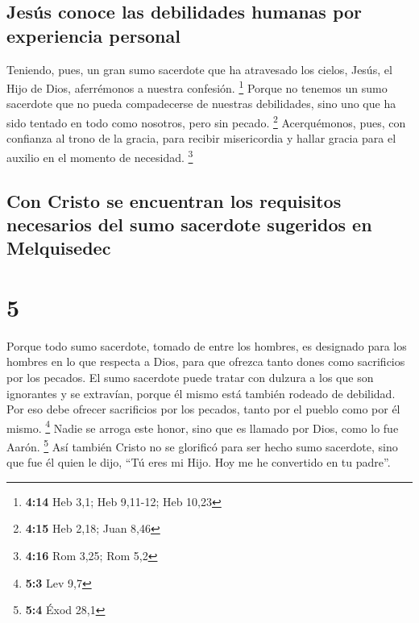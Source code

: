 \hypertarget{jesuxfas-conoce-las-debilidades-humanas-por-experiencia-personal}{%
\subsection{Jesús conoce las debilidades humanas por experiencia
personal}\label{jesuxfas-conoce-las-debilidades-humanas-por-experiencia-personal}}

 Teniendo, pues, un gran sumo sacerdote que ha atravesado
los cielos, Jesús, el Hijo de Dios, aferrémonos a nuestra confesión.
\footnote{\textbf{4:14} Heb 3,1; Heb 9,11-12; Heb 10,23} 
Porque no tenemos un sumo sacerdote que no pueda compadecerse de
nuestras debilidades, sino uno que ha sido tentado en todo como
nosotros, pero sin pecado. \footnote{\textbf{4:15} Heb 2,18; Juan 8,46}
 Acerquémonos, pues, con confianza al trono de la gracia,
para recibir misericordia y hallar gracia para el auxilio en el momento
de necesidad. \footnote{\textbf{4:16} Rom 3,25; Rom 5,2}

\hypertarget{con-cristo-se-encuentran-los-requisitos-necesarios-del-sumo-sacerdote-sugeridos-en-melquisedec}{%
\subsection{Con Cristo se encuentran los requisitos necesarios del sumo
sacerdote sugeridos en
Melquisedec}\label{con-cristo-se-encuentran-los-requisitos-necesarios-del-sumo-sacerdote-sugeridos-en-melquisedec}}

\hypertarget{section-4}{%
\section{5}\label{section-4}}

 Porque todo sumo sacerdote, tomado de entre los hombres,
es designado para los hombres en lo que respecta a Dios, para que
ofrezca tanto dones como sacrificios por los pecados.  El
sumo sacerdote puede tratar con dulzura a los que son ignorantes y se
extravían, porque él mismo está también rodeado de debilidad.
 Por eso debe ofrecer sacrificios por los pecados, tanto
por el pueblo como por él mismo. \footnote{\textbf{5:3} Lev 9,7}
 Nadie se arroga este honor, sino que es llamado por Dios,
como lo fue Aarón. \footnote{\textbf{5:4} Éxod 28,1}  Así
también Cristo no se glorificó para ser hecho sumo sacerdote, sino que
fue él quien le dijo, ``Tú eres mi Hijo. Hoy me he convertido en tu
padre''.

